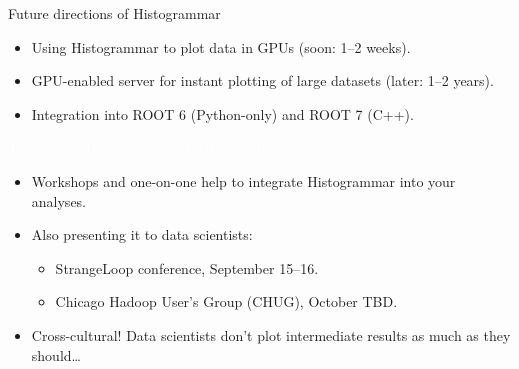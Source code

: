 \documentclass{beamer}
\begin{document}
\begin{frame}{Future directions of Histogrammar}
\vspace{0.5 cm}
\begin{itemize}\setlength{\itemsep}{0.2 cm}
\item Using Histogrammar to plot data in GPUs (soon: 1--2 weeks).
\item GPU-enabled server for instant plotting of large datasets (later: 1--2 years).
\item Integration into ROOT 6 (Python-only) and ROOT 7 (C++).
\end{itemize}

\vspace{1 cm}

\vspace{-0.35 cm}
\hspace{-0.83 cm} \textcolor{white}{\Large Targeting both physicists and data scientists}

\vspace{0.35 cm}
\begin{itemize}\setlength{\itemsep}{0.2 cm}
\item Workshops and one-on-one help to integrate Histogrammar into your analyses.
\item Also presenting it to data scientists:
\begin{itemize}
\item StrangeLoop conference, September 15--16.
\item Chicago Hadoop User's Group (CHUG), October TBD.
\end{itemize}
\item Cross-cultural! Data scientists don't plot intermediate results as much as they should\ldots
\end{itemize}
\end{frame}
\end{document}
